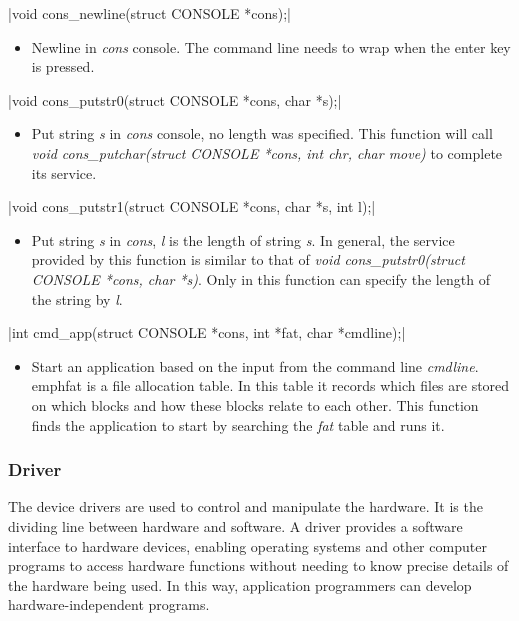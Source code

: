 \documentclass{swfcthesis}
\begin{document}
\csingle|void cons_newline(struct CONSOLE *cons);|
\begin{itemize}
\item Newline in \emph{cons} console. The command line needs to wrap when the enter key is
  pressed. 
  
\end{itemize}

\csingle|void cons_putstr0(struct CONSOLE *cons, char *s);|
\begin{itemize}
\item Put string \emph{s} in \emph{cons} console, no length was specified. This function
  will call \emph{void cons\_putchar(struct CONSOLE *cons, int chr, char move)} to
  complete its service. 
  
  
\end{itemize}

\csingle|void cons_putstr1(struct CONSOLE *cons, char *s, int l);|
\begin{itemize}
\item Put string \emph{s} in \emph{cons}, \emph{l} is the length of string
  \emph{s}. In general, the service provided by this function is similar to that of
  \emph{void cons\_putstr0(struct CONSOLE *cons, char *s)}. Only in this function can
  specify the length of the string by \emph{l}.
  
\end{itemize}

\csingle|int cmd_app(struct CONSOLE *cons, int *fat, char *cmdline);|
\begin{itemize}
\item Start an application based on the input from the command line
  \emph{cmdline}. emph{fat} is a file allocation
  table. In this table it records which files are stored on which blocks and how these
  blocks relate to each other. This function finds the application to start by searching
  the \emph{fat} table and runs it. 
  
  
\end{itemize}

\subsubsection{Driver}
\label{sec:driver}

The device drivers are used to control and manipulate the hardware. It is the dividing
line between hardware and software. A driver provides a software interface to hardware
devices, enabling operating systems and other computer programs to access hardware
functions without needing to know precise details of the hardware being used. In this way,
application programmers can develop hardware-independent programs.
\end{document}
